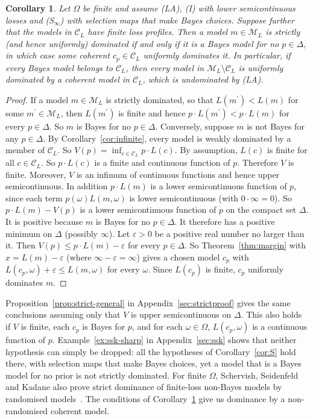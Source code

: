 \documentclass[11pt]{article}
\newtheorem{corollary}[theorem]{Corollary}
\theoremstyle{definition}
\theoremstyle{remark}
\newcommand{\M}{\mathcal M}
\newcommand{\C}{\mathcal C}
\begin{document}
\begin{corollary}\label{cor:strict}
Let $\Omega$ be finite and assume (LA), (I) with lower semicontinuous losses and (S$_\infty$) with selection maps that make Bayes choices.  Suppose further that the models in $\C_L$ have finite loss profiles. Then a model $m\in\M_L$ is strictly (and hence uniformly) dominated if and only if it is a Bayes model for no $p\in\Delta$, in which case some coherent $c_p\in\C_L$ uniformly dominates it. In particular, if every Bayes model belongs to $\C_L$, then every model in $\M_L\setminus\C_L$ is uniformly dominated by a coherent model in $\C_L$, which is undominated by (LA).
\end{corollary}
\begin{proof}
If a model $m\in\M_L$ is strictly dominated, so that $L(m^\prime)<L(m)$ for some $m^\prime\in\M_L$, then $L(m^\prime)$ is finite and hence $p\cdot L(m^\prime)<p\cdot L(m)$ for every $p\in\Delta$. So $m$ is Bayes for no $p\in\Delta$. Conversely, suppose $m$ is not Bayes for any $p\in\Delta$. By Corollary~\ref{cor:infinite}, every model is weakly dominated by a member of $\C_L$. So $V(p)=\inf_{c\in\C_L}p\cdot L(c)$. By assumption, $L(c)$ is finite for all $c\in\C_L$. So $p\cdot L(c)$ is a finite and continuous function of $p$. Therefore $V$ is finite. Moreover, $V$ is an infimum of continuous functions and hence upper semicontinuous. In addition $p\cdot L(m)$ is a lower semicontinuous function of $p$, since each term $p(\omega) L(m,\omega)$ is lower semicontinuous (with $0\cdot\infty=0$). So $p\cdot L(m)-V(p)$ is a lower semicontinuous function of $p$ on the compact set $\Delta$. It is positive because $m$ is Bayes for no $p\in\Delta$. It therefore has a positive minimum on $\Delta$ (possibly $\infty$). Let $\varepsilon>0$ be a positive real number no larger than it. Then $V(p)\le p\cdot L(m)-\varepsilon$ for every $p\in\Delta$. So Theorem~\ref{thm:margin} with $x=L(m)-\varepsilon$ (where $\infty-\varepsilon=\infty$) gives a chosen model $c_p$ with $L(c_p,\omega)+\varepsilon\le L(m,\omega)$ for every $\omega$. Since $L(c_p)$ is finite, $c_p$ uniformly dominates $m$.
\end{proof}
Proposition~\ref{prop:strict-general} in Appendix~\ref{sec:strictproof} gives the same conclusions assuming only that $V$ is upper semicontinuous on $\Delta$. This also holds if $V$ is finite, each $c_p$ is Bayes for $p$, and for each $\omega\in\Omega$, $L(c_p,\omega)$ is a continuous function of $p$. Example~\ref{ex:ssk-sharp} in Appendix~\ref{sec:ssk} shows that neither hypothesis can simply be dropped: all the hypotheses of Corollary~\ref{cor:S} hold there, with selection maps that make Bayes choices, yet a model that is a Bayes model for no prior is not strictly dominated.
For finite $\Omega$, Schervish, Seidenfeld and Kadane also prove strict dominance of finite-loss non-Bayes models by randomised models~\cite[Theorem~7]{SSK09}. The conditions of Corollary~\ref{cor:strict} give us dominance by a non-randomised coherent model. 
\end{document}
